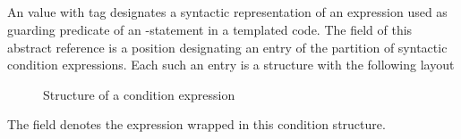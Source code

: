 

\subsection{}
\label{sec:ifc:ExprSort:Condition}

An  value with tag  designates a syntactic 
representation of an expression used as guarding predicate of an -statement in a templated code.
The  field of this abstract reference is a position designating an entry of the
partition of syntactic condition expressions.  Each such an entry is a structure with the following layout
%
\begin{figure}[H]
	\centering
	\caption{Structure of a condition expression}
	\label{fig:ifc:ExprSort:Condition}
\end{figure}
%
The  field denotes the expression wrapped in this condition structure.




\subsection{}
\label{sec:ifc:ExprSort:ExpressionList}

